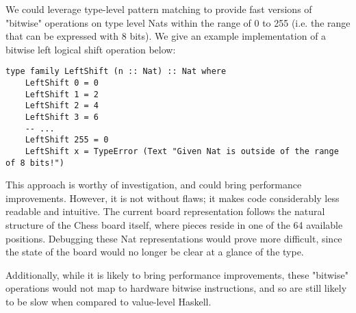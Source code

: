 We could leverage type-level pattern matching to provide fast versions of "bitwise" operations on type level Nats within the range of 0 to 255 (i.e. the range that can be expressed with 8 bits). We give an example implementation of a bitwise left logical shift operation below:

\begin{lstlisting}
type family LeftShift (n :: Nat) :: Nat where
    LeftShift 0 = 0
    LeftShift 1 = 2
    LeftShift 2 = 4
    LeftShift 3 = 6
    -- ...
    LeftShift 255 = 0
    LeftShift x = TypeError (Text "Given Nat is outside of the range of 8 bits!")
\end{lstlisting}

This approach is worthy of investigation, and could bring performance improvements. However, it is not without flaws; it makes code considerably less readable and intuitive. The current board representation follows the natural structure of the Chess board itself, where pieces reside in one of the 64 available positions. Debugging these Nat representations would prove more difficult, since the state of the board would no longer be clear at a glance of the type.

Additionally, while it is likely to bring performance improvements, these "bitwise" operations would not map to hardware bitwise instructions, and so are still likely to be slow when compared to value-level Haskell.